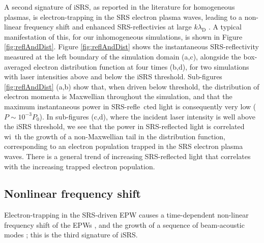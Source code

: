 A second signature of iSRS, as reported in the literature for homogeneous plasmas, is electron-trapping in the SRS electron plasma waves, leading to a
non-linear frequency shift and enhanced SRS-reflectivies at large $k\lambda_\mathrm{D}$ \cite{Vu2002}.
A typical manifestation of this, for our inhomogeneous simulations, is shown in Figure \ref{fig:reflAndDist}. Figure \ref{fig:reflAndDist}
shows the instantaneous SRS-reflectivity measured at the left boundary of the simulation domain (a,c), alongside the box-averaged electron
distribution function at four times (b,d), for two simulations with laser intensities above and below the iSRS threshold.
Sub-figures \ref{fig:reflAndDist} (a,b) show that, when driven below threshold, the distribution of electron momenta is Maxwellian throughout the simulation, and that the maximum instantaneous power in SRS-refle\
cted light is consequently very low ($P \sim 10^{-3}P_0$). In sub-figures (c,d), where the incident laser intensity is well above the iSRS threshold, we see that the power in SRS-reflected light is correlated wi\
th the growth of a non-Maxwellian tail in the distribution function, corresponding to an electron population trapped in the SRS electron plasma waves.
There is a general trend of increasing SRS-reflected light that correlates with
the increasing trapped electron population.


\subsection{Nonlinear frequency shift}
Electron-trapping in the SRS-driven EPW causes a time-dependent non-linear frequency shift of
the EPWs \cite{Morales1972,Kline2006}, and the growth of a sequence of beam-acoustic modes \cite{Yin2006}; this is the third signature of iSRS.

